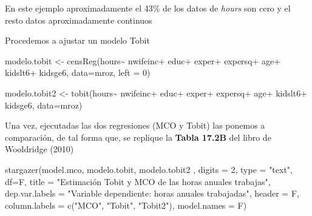 \documentclass[
  letterpaper,
  DIV=11,
  numbers=noendperiod]{scrreprt}
\newenvironment{Shaded}{\begin{snugshade}}{\end{snugshade}}
\newcommand{\AttributeTok}[1]{\textcolor[rgb]{0.40,0.45,0.13}{#1}}
\newcommand{\DecValTok}[1]{\textcolor[rgb]{0.68,0.00,0.00}{#1}}
\newcommand{\FunctionTok}[1]{\textcolor[rgb]{0.28,0.35,0.67}{#1}}
\newcommand{\NormalTok}[1]{\textcolor[rgb]{0.00,0.23,0.31}{#1}}
\newcommand{\OtherTok}[1]{\textcolor[rgb]{0.00,0.23,0.31}{#1}}
\newcommand{\SpecialCharTok}[1]{\textcolor[rgb]{0.37,0.37,0.37}{#1}}
\newcommand{\StringTok}[1]{\textcolor[rgb]{0.13,0.47,0.30}{#1}}
\begin{document}
En este ejemplo aproximadamente el 43\% de los datos de \emph{hours} son
cero y el resto datos aproximadamente continuos

Procedemos a ajustar un modelo Tobit

\begin{Shaded}
\begin{Highlighting}[]
\NormalTok{modelo.tobit }\OtherTok{\textless{}{-}} \FunctionTok{censReg}\NormalTok{(hours}\SpecialCharTok{\textasciitilde{}}
\NormalTok{                nwifeinc}\SpecialCharTok{+}
\NormalTok{                 educ}\SpecialCharTok{+}
\NormalTok{                 exper}\SpecialCharTok{+}
\NormalTok{                 expersq}\SpecialCharTok{+}
\NormalTok{                 age}\SpecialCharTok{+}
\NormalTok{                 kidslt6}\SpecialCharTok{+}
\NormalTok{                 kidsge6,}
               \AttributeTok{data=}\NormalTok{mroz,}
               \AttributeTok{left =} \DecValTok{0}\NormalTok{)}

\NormalTok{modelo.tobit2 }\OtherTok{\textless{}{-}} \FunctionTok{tobit}\NormalTok{(hours}\SpecialCharTok{\textasciitilde{}}
\NormalTok{                nwifeinc}\SpecialCharTok{+}
\NormalTok{                 educ}\SpecialCharTok{+}
\NormalTok{                 exper}\SpecialCharTok{+}
\NormalTok{                 expersq}\SpecialCharTok{+}
\NormalTok{                 age}\SpecialCharTok{+}
\NormalTok{                 kidslt6}\SpecialCharTok{+}
\NormalTok{                 kidsge6,}
               \AttributeTok{data=}\NormalTok{mroz)}
\end{Highlighting}
\end{Shaded}

Una vez, ejecutadas las dos regresiones (MCO y Tobit) las ponemos a
comparación, de tal forma que, se replique la \textbf{Tabla 17.2B} del
libro de Wooldridge (2010)

\begin{Shaded}
\begin{Highlighting}[]
\FunctionTok{stargazer}\NormalTok{(model.mco, }
\NormalTok{          modelo.tobit, }
\NormalTok{          modelo.tobit2 ,}
          \AttributeTok{digits =} \DecValTok{2}\NormalTok{,}
          \AttributeTok{type =} \StringTok{"text"}\NormalTok{,}
          \AttributeTok{df=}\NormalTok{F,}
          \AttributeTok{title =} \StringTok{"Estimación Tobit y MCO de las horas anuales trabajas"}\NormalTok{,}
          \AttributeTok{dep.var.labels =} \StringTok{"Variable dependiente: horas anuales trabajadas"}\NormalTok{,}
          \AttributeTok{header =}\NormalTok{ F,}
          \AttributeTok{column.labels =} \FunctionTok{c}\NormalTok{(}\StringTok{"MCO"}\NormalTok{, }\StringTok{"Tobit"}\NormalTok{, }\StringTok{"Tobit2"}\NormalTok{),}
          \AttributeTok{model.names =}\NormalTok{ F)}
\end{Highlighting}
\end{Shaded}
\end{document}
